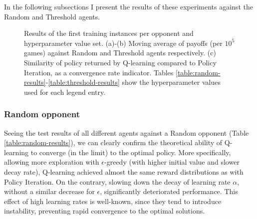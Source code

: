 In the following subsections I present the results of these experiments against the Random and Threshold agents.

\begin{figure}[htpb]
\renewcommand*\thesubfigure{\alph{subfigure}}
\centering
\caption{Results of the first training instances per opponent and hyperparameter value set. (a)-(b) Moving average of payoffs (per $10^5$ games) against Random and Threshold agents respectively. (c) Similarity of policy returned by Q-learning compared to Policy Iteration, as a convergence rate indicator. Tables \ref{table:random-results}-\ref{table:threshold-results} show the hyperparameter values used for each legend entry.
}
\label{fig:1}
\end{figure}

\subsubsection{Random opponent}

Seeing the test results of all different agents against a Random opponent (Table \ref{table:random-results}), we can clearly confirm the theoretical ability of Q-learning to converge (in the limit) to the optimal policy. More specifically, allowing more exploration with $\epsilon$-greedy (with higher initial value and slower decay rate), Q-learning achieved almost the same reward distributions as with Policy Iteration. On the contrary, slowing down the decay of learning rate $\alpha$, without a similar decrease for $\epsilon$, significantly deteriorated performance. This effect of high learning rates is well-known, since they tend to introduce instability, preventing rapid convergence to the optimal solutions.

